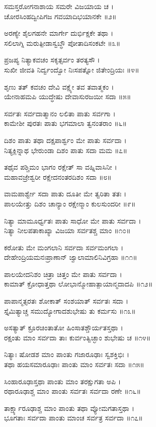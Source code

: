ಸಮಸ್ತರೋಗನಾಶಾಯ ಸಮರೇ ವಿಜಯಾಯ ಚ ।\\
ಚೋರಸಿಂಹದ್ವೀಪಿಗಜ ಗವಯಾದಿಭಯಾನಕೇ ॥೨॥

ಅರಣ್ಯೇ ಶೈಲಗಹನೇ ಮಾರ್ಗೇ ದುರ್ಭಿಕ್ಷಕೇ ತಥಾ ।\\
ಸಲಿಲಾಗ್ನಿ ಮರುತ್ಪೀಡಾಸ್ವಬ್ಧೌ ಪೋತಾದಿಸಂಕಟೇ ॥೩॥

ಪ್ರಜಪ್ಯ ನಿತ್ಯಾಕವಚಂ ಸಕೃತ್ಸರ್ವಂ ತರತ್ಯಸೌ ।\\
ಸುಖೀ ಜೀವತಿ ನಿರ್ದ್ವಂದ್ವೋ ನಿಃಸಪತ್ನೋ ಜಿತೇಂದ್ರಿಯಃ ॥೪॥

ಶೃಣು ತತ್ ಕವಚಂ ದೇವಿ ವಕ್ಷ್ಯೇ ತವ ತವಾತ್ಮಕಂ ।\\
ಯೇನಾಹಮಪಿ ಯುದ್ಧೇಷು ದೇವಾಸುರಜಯೀ ಸದಾ ॥೫॥

ಸರ್ವತಃ ಸರ್ವದಾತ್ಮಾನಂ ಲಲಿತಾ ಪಾತು ಸರ್ವಗಾ ।\\
ಕಾಮೇಶೀ ಪುರತಃ ಪಾತು ಭಗಮಾಲಾ ತ್ವನಂತರಾಂ ॥೬॥

ದಿಶಂ ಪಾತು ತಥಾ ದಕ್ಷಪಾರ್ಶ್ವಂ ಮೇ ಪಾತು ಸರ್ವದಾ ।\\
ನಿತ್ಯಕ್ಲಿನ್ನಾಥ ಭೇರುಂಡಾ ದಿಶಂ ಪಾತು ಸದಾ ಮಮ ॥೭॥

ತಥೈವ ಪಶ್ಚಿಮಂ ಭಾಗಂ ರಕ್ಷೇತ್ ಸಾ ವಹ್ನಿವಾಸಿನೀ ।\\
ಮಹಾವಜ್ರೇಶ್ವರೀ ರಕ್ಷೇದನಂತರದಿಶಂ ಸದಾ ॥೮॥

ವಾಮಪಾರ್ಶ್ವೇ ಸದಾ ಪಾತು ದೂತೀ ಮೇ ತ್ವರಿತಾ ತತಃ ।\\
ಪಾಲಯೇತ್ತು ದಿಶಂ ಚಾನ್ಯಾಂ ರಕ್ಷೇನ್ಮಾಂ ಕುಲಸುಂದರೀ ॥೯॥

ನಿತ್ಯಾ ಮಾಮೂರ್ಧ್ವತಃ ಪಾತು ಸಾಧೋ ಮೇ ಪಾತು ಸರ್ವದಾ ।\\
ನಿತ್ಯಾ ನೀಲಪತಾಕಾಖ್ಯಾ ವಿಜಯಾ ಸರ್ವತಶ್ಚ ಮಾಂ ॥೧೦॥

ಕರೋತು ಮೇ ಮಂಗಲಾನಿ ಸರ್ವದಾ ಸರ್ವಮಂಗಲಾ ।\\
ದೇಹೇಂದ್ರಿಯಮನಃಪ್ರಾಣಾನ್ ಜ್ವಾಲಾಮಾಲಿನಿವಿಗ್ರಹಾ ॥೧೧॥

ಪಾಲಯೇದನಿಶಂ ಚಿತ್ರಾ ಚಿತ್ತಂ ಮೇ ಪಾತು ಸರ್ವದಾ ।\\
ಕಾಮಾತ್ ಕ್ರೋಧಾತ್ತಥಾ ಲೋಭಾನ್ಮೋಹಾತ್ಪಾಯಾನ್ಮದಾದಪಿ ॥೧೨॥

ಪಾಪಾನ್ಮತ್ಸರತಃ ಶೋಕಾತ್ ಸಂಶಯಾತ್ ಸರ್ವತಃ ಸದಾ ।\\
ಸ್ತೈಮಿತ್ಯಾಚ್ಚ ಸಮುದ್ಯೋಗಾದಶುಭೇಷು ತು ಕರ್ಮಸು ॥೧೩॥

ಅಸತ್ಯಾತ್ ಕ್ರೂರಚಿಂತಾತೋ ಹಿಂಸಾತಶ್ಚೌರ್ಯತಸ್ತಥಾ ।\\
ರಕ್ಷಂತು ಮಾಂ ಸರ್ವದಾ ತಾಃ ಕುರ್ವಂತ್ವಿಚ್ಛಾಂ ಶುಭೇಷು ಚ ॥೧೪॥

ನಿತ್ಯಾಃ ಷೋಡಶ ಮಾಂ ಪಾಂತು ಗಜಾರೂಢಾಃ ಸ್ವಶಕ್ತಿಭಿಃ ।\\
ತಥಾ ಹಯಸಮಾರೂಢಾಃ ಪಾಂತು ಮಾಂ ಸರ್ವತಃ ಸದಾ ॥೧೫॥

ಸಿಂಹಾರೂಢಾಸ್ತಥಾ ಪಾಂತು ಮಾಂ ತರಕ್ಷುಗತಾ ಅಪಿ ।\\
ರಥಾರೂಢಾಶ್ಚ ಮಾಂ ಪಾಂತು ಸರ್ವತಃ ಸರ್ವದಾ ರಣೇ ॥೧೬॥

ತಾರ್ಕ್ಷ್ಯಾರೂಢಾಶ್ಚ ಮಾಂ ಪಾಂತು ತಥಾ ವ್ಯೋಮಗತಾಸ್ತಥಾ ।\\
ಭೂಗತಾಃ ಸರ್ವದಾ ಪಾಂತು ಮಾಂಚ ಸರ್ವತ್ರ ಸರ್ವದಾ ॥೧೭॥

